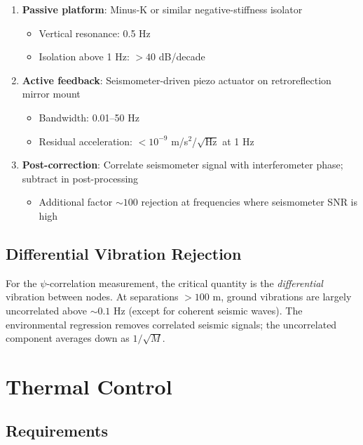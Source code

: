 \documentclass[12pt,a4paper]{article}
\begin{document}
\begin{enumerate}
\item \textbf{Passive platform}: Minus-K or similar negative-stiffness
isolator
\begin{itemize}
\item Vertical resonance: 0.5 Hz
\item Isolation above 1 Hz: $> 40$ dB/decade
\end{itemize}

\item \textbf{Active feedback}: Seismometer-driven piezo actuator on
retroreflection mirror mount
\begin{itemize}
\item Bandwidth: 0.01--50 Hz
\item Residual acceleration: $< 10^{-9}$ m/s$^2$/$\sqrt{\text{Hz}}$
at 1 Hz
\end{itemize}

\item \textbf{Post-correction}: Correlate seismometer signal with
interferometer phase; subtract in post-processing
\begin{itemize}
\item Additional factor $\sim 100$ rejection at frequencies where
seismometer SNR is high
\end{itemize}
\end{enumerate}

\subsection{Differential Vibration Rejection}

For the $\psi$-correlation measurement, the critical quantity is the
\emph{differential} vibration between nodes. At separations $> 100$ m,
ground vibrations are largely uncorrelated above $\sim 0.1$ Hz (except
for coherent seismic waves). The environmental regression removes
correlated seismic signals; the uncorrelated component averages down
as $1/\sqrt{M}$.


\section{Thermal Control}\label{sec:thermal}

\subsection{Requirements}
\end{document}
